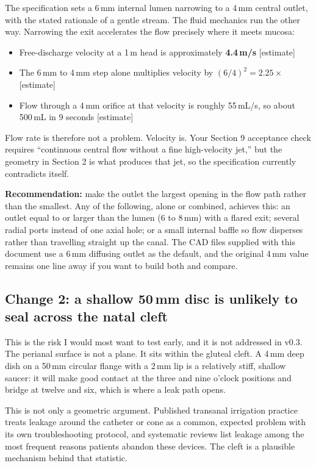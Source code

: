 \documentclass[11pt]{article}
\newcommand{\panelbox}[1]{%
  \par\vspace{0.5em}%
  \noindent\colorbox{panel}{%
    \begin{minipage}{\dimexpr\linewidth-2\fboxsep}%
      \vspace{0.35em}#1\vspace{0.35em}%
    \end{minipage}}%
  \par\vspace{0.6em}}
\newcommand{\est}{\mbox{\textcolor{warn}{\footnotesize[estimate]}}}
\begin{document}
The specification sets a 6\,mm internal lumen narrowing to a 4\,mm central outlet, with the stated rationale of a gentle stream. The fluid mechanics run the other way. Narrowing the exit accelerates the flow precisely where it meets mucosa:

\panelbox{
\begin{itemize}[leftmargin=1.4em]
  \item Free-discharge velocity at a 1\,m head is approximately \textbf{4.4\,m/s} \est
  \item The 6\,mm to 4\,mm step alone multiplies velocity by $(6/4)^2 = \mathbf{2.25\times}$ \est
  \item Flow through a 4\,mm orifice at that velocity is roughly 55\,mL/s, so about 500\,mL in 9 seconds \est
\end{itemize}}

\noindent Flow rate is therefore not a problem. Velocity is. Your Section 9 acceptance check requires ``continuous central flow without a fine high-velocity jet,'' but the geometry in Section 2 is what produces that jet, so the specification currently contradicts itself.

\textbf{Recommendation:} make the outlet the largest opening in the flow path rather than the smallest. Any of the following, alone or combined, achieves this: an outlet equal to or larger than the lumen (6 to 8\,mm) with a flared exit; several radial ports instead of one axial hole; or a small internal baffle so flow disperses rather than travelling straight up the canal. The CAD files supplied with this document use a 6\,mm diffusing outlet as the default, and the original 4\,mm value remains one line away if you want to build both and compare.

\subsection*{Change 2: a shallow 50\,mm disc is unlikely to seal across the natal cleft}

This is the risk I would most want to test early, and it is not addressed in v0.3. The perianal surface is not a plane. It sits within the gluteal cleft. A 4\,mm deep dish on a 50\,mm circular flange with a 2\,mm lip is a relatively stiff, shallow saucer: it will make good contact at the three and nine o'clock positions and bridge at twelve and six, which is where a leak path opens.

This is not only a geometric argument. Published transanal irrigation practice treats leakage around the catheter or cone as a common, expected problem with its own troubleshooting protocol, and systematic reviews list leakage among the most frequent reasons patients abandon these devices. The cleft is a plausible mechanism behind that statistic.
\end{document}
